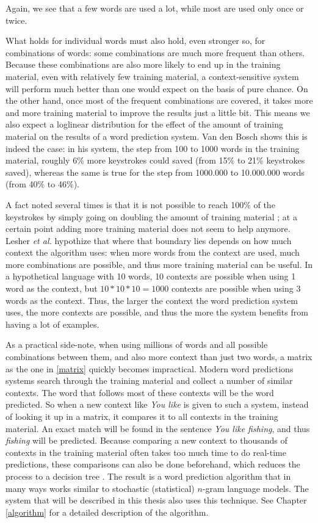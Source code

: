 \documentclass[11pt]{article}
\begin{document}
Again, we see that a few words are used a lot, while most are used only once or twice.

What holds for individual words must also hold, even stronger so, for combinations of words: some combinations are much more frequent than others. Because these combinations are also more likely to end up in the training material, even with relatively few training material, a context-sensitive system will perform much better than one would expect on the basis of pure chance. On the other hand, once most of the frequent combinations are covered, it takes more and more training material to improve the results just a little bit. This means we also expect a loglinear distribution for the effect of the amount of training material on the results of a word prediction system. Van den Bosch  shows this is indeed the case: in his system, the step from 100 to 1000 words in the training material, roughly 6\% more keystrokes could saved (from 15\% to 21\% keystrokes saved), whereas the same is true for the step from 1000.000 to 10.000.000 words (from 40\% to 46\%).

A fact noted several times is that it is not possible to reach 100\% of the keystrokes by simply going on doubling the amount of training material \cite{Lesher+99,vandenbosch11}; at a certain point adding more training material does not seem to help anymore. Lesher {\em et al.}  hypothize that where that boundary lies depends on how much context the algorithm uses: when more words from the context are used, much more combinations are possible, and thus more training material can be useful. In a hypothetical language with 10 words, 10 contexts are possible when using 1 word as the context, but $10*10*10 = 1000$ contexts are possible when using 3 words as the context. Thus, the larger the context the word prediction system uses, the more contexts are possible, and thus the more the system benefits from having a lot of examples.

As a practical side-note, when using millions of words and all possible combinations between them, and also more context than just two words, a matrix as the one in \ref{matrix} quickly becomes impractical. Modern word predictions systems search through the training material and collect a number of similar contexts. The word that follows most of these contexts will be the word predicted. So when a new context like \emph{You like} is given to such a system, instead of looking it up in a matrix, it compares it to all contexts in the training material. An exact match will be found in the sentence \emph{You like fishing}, and thus \emph{fishing} will be predicted. Because comparing a new context to thousands of contexts in the training material often takes too much time to do real-time predictions, these comparisons can also be done beforehand, which reduces the process to a decision tree \cite{daelemans+97,vandenbosch+08,vandenbosch11}. The result is a word prediction algorithm that in many ways works similar to stochastic (statistical) $n$-gram language models. The system that will be described in this thesis also uses this technique. See Chapter \ref{algorithm} for a detailed description of the algorithm.
\end{document}
